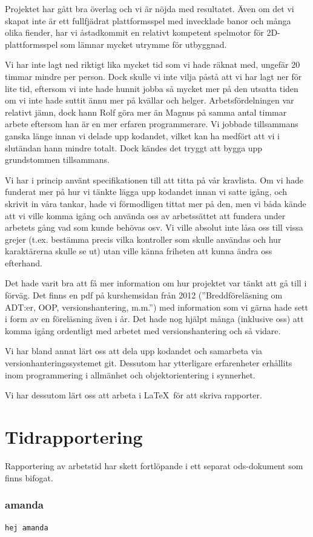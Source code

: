 \documentclass{scrartcl}
\newcommand{\code}[1]%
{\texttt{#1}}
\begin{document}
Projektet har gått bra överlag och vi är nöjda med resultatet. Även om det vi skapat inte är ett fullfjädrat plattformsspel med invecklade banor och många olika fiender, har vi åstadkommit en relativt kompetent spelmotor för 2D-plattformsspel som lämnar mycket utrymme för utbyggnad.

Vi har inte lagt ned riktigt lika mycket tid som vi hade räknat med, ungefär 20 timmar mindre per person. Dock skulle vi inte vilja påstå att vi har lagt ner för lite tid, eftersom vi inte hade hunnit jobba så mycket mer på den utsatta tiden om vi inte hade suttit ännu mer på kvällar och helger. Arbetsfördelningen var relativt jämn, dock hann Rolf göra mer än Magnus på samma antal timmar arbete eftersom han är en mer erfaren programmerare. Vi jobbade tillsammans ganska länge innan vi delade upp kodandet, vilket kan ha medfört att vi i slutändan hann mindre totalt. Dock kändes det tryggt att bygga upp grundstommen tillsammans. 

Vi har i princip använt specifikationen till att titta på vår kravlista. Om vi hade funderat mer på hur vi tänkte lägga upp kodandet innan vi satte igång, och skrivit in våra tankar, hade vi förmodligen tittat mer på den, men vi båda kände att vi ville komma igång och använda oss av arbetssättet att fundera under arbetets gång vad som kunde behövas osv. Vi ville absolut inte låsa oss till vissa grejer (t.ex. bestämma precis vilka kontroller som skulle användas och hur karaktärerna skulle se ut) utan ville känna friheten att kunna ändra oss efterhand. 

Det hade varit bra att få mer information om hur projektet var tänkt att gå till i förväg. Det finns en pdf på kurshemsidan från 2012 (''Breddföreläsning om ADT:er, OOP, versionshantering, m.m.'') med information som vi gärna hade sett i form av en föreläsning även i år. Det hade nog hjälpt många (inklusive oss) att komma igång ordentligt med arbetet med versionshantering och så vidare.

Vi har bland annat lärt oss att dela upp kodandet och samarbeta via versionhanteringssystemet git. Dessutom har ytterligare erfarenheter erhållits inom programmering i allmänhet och objektorientering i synnerhet. 

Vi har dessutom lärt oss att arbeta i \LaTeX\ för att skriva rapporter.

\section{Tidrapportering}
Rapportering av arbetstid har skett fortlöpande i ett separat ods-dokument som finns bifogat.

\subsubsection{amanda}
\code{hej amanda}
\end{document}
